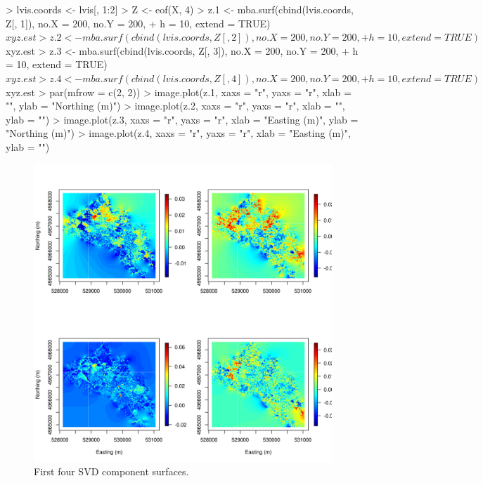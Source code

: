 \documentclass{article}
\begin{document}
\begin{Schunk}
\begin{Sinput}
> lvis.coords <- lvis[, 1:2]
> Z <- eof(X, 4)
> z.1 <- mba.surf(cbind(lvis.coords, Z[, 1]), no.X = 200, no.Y = 200, 
+     h = 10, extend = TRUE)$xyz.est
> z.2 <- mba.surf(cbind(lvis.coords, Z[, 2]), no.X = 200, no.Y = 200, 
+     h = 10, extend = TRUE)$xyz.est
> z.3 <- mba.surf(cbind(lvis.coords, Z[, 3]), no.X = 200, no.Y = 200, 
+     h = 10, extend = TRUE)$xyz.est
> z.4 <- mba.surf(cbind(lvis.coords, Z[, 4]), no.X = 200, no.Y = 200, 
+     h = 10, extend = TRUE)$xyz.est
> par(mfrow = c(2, 2))
> image.plot(z.1, xaxs = "r", yaxs = "r", xlab = "", ylab = "Northing (m)")
> image.plot(z.2, xaxs = "r", yaxs = "r", xlab = "", ylab = "")
> image.plot(z.3, xaxs = "r", yaxs = "r", xlab = "Easting (m)", ylab = "Northing (m)")
> image.plot(z.4, xaxs = "r", yaxs = "r", xlab = "Easting (m)", ylab = "")
\end{Sinput}
\end{Schunk}

\begin{figure}
\begin{center}
\includegraphics[width=15cm]{figures/fig-SVDSurf}
\end{center}
\caption{First four SVD component surfaces.}
\label{fig:SVDSurf}
\end{figure}
\end{document}
